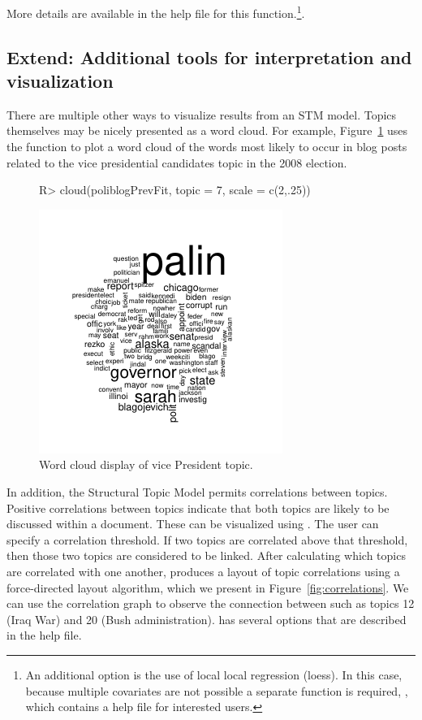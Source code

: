 \documentclass[article,shortnames]{jss}
\begin{document}
More details are available in the help file for this function.\footnote{An additional option is the use of local local regression (loess). In this case, because multiple covariates are not possible a separate function is required, , which contains a help file for interested users.}.
\FloatBarrier
\subsection{Extend: Additional tools for interpretation and visualization}

There are multiple other ways to visualize results from an STM model. Topics themselves may be nicely presented as a word cloud. For example, Figure~\ref{fig:cloud} uses the  function to plot a word cloud of the words most likely to occur in blog posts related to the vice presidential candidates topic in the 2008 election.

\begin{figure}
\vspace{-20pt}
\begin{center}
\begin{Schunk}
\begin{Sinput}
R> cloud(poliblogPrevFit, topic = 7, scale = c(2,.25))
\end{Sinput}
\end{Schunk}
\includegraphics{stmVignette-024}
\caption{Word cloud display of vice President topic.}
\label{fig:cloud}
\end{center}
\vspace{-20pt}
\end{figure}


In addition, the Structural Topic Model permits correlations between topics. Positive correlations between topics indicate that both topics are likely to be discussed within a document. These can be visualized using . The user can specify a correlation threshold.  If two topics are correlated above that threshold, then those two topics are considered to be linked.  After calculating which topics are correlated with one another,  produces a layout of topic correlations using a force-directed layout algorithm, which we present in Figure~\ref{fig:correlations}. We can use the correlation graph to observe the connection between such as topics 12 (Iraq War) and 20 (Bush administration).  has several options that are described in the help file.
\end{document}
